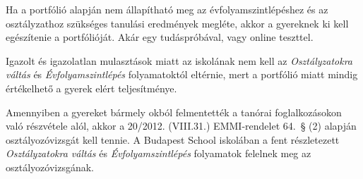 Ha a portfólió alapján nem állapítható meg az évfolyamszintlépéshez és az osztályzathoz szükséges tanulási eredmények megléte, akkor a gyereknek ki kell egészítenie a portfólióját. Akár egy tudáspróbával, vagy online teszttel.

Igazolt és igazolatlan mulasztások miatt az iskolának nem kell az \emph{Osztályzatokra váltás} és \emph{Évfolyamszintlépés} folyamatoktól eltérnie, mert a portfólió miatt mindig értékelhető a gyerek elért teljesítménye.

Amennyiben a gyereket bármely okból felmentették a tanórai foglalkozásokon való részvétele alól, akkor a 20/2012. (VIII.31.) EMMI-rendelet 64.~§ (2)  alapján osztályozóvizsgát kell tennie. A Budapest School iskolában a fent részletezett \emph{Osztályzatokra váltás} és \emph{Évfolyamszintlépés} folyamatok  felelnek meg az osztályozóvizsgának.
